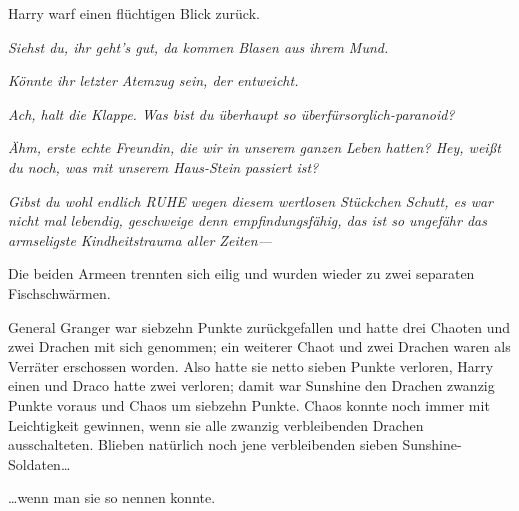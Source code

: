 Harry warf einen flüchtigen Blick zurück.

\emph{Siehst du, ihr geht’s gut, da kommen Blasen aus ihrem Mund.}

\emph{Könnte ihr letzter Atemzug sein, der entweicht.}

\emph{Ach, halt die Klappe. Was bist du überhaupt so überfürsorglich-paranoid?}

\emph{Ähm, erste echte Freundin, die wir in unserem ganzen Leben hatten? Hey, weißt du noch, was mit unserem Haus-Stein passiert ist?}

\emph{Gibst du wohl endlich RUHE wegen diesem wertlosen Stückchen Schutt, es war nicht mal lebendig, geschweige denn empfindungsfähig, das ist so ungefähr das armseligste Kindheitstrauma aller Zeiten—}

Die beiden Armeen trennten sich eilig und wurden wieder zu zwei separaten Fischschwärmen.

General Granger war siebzehn Punkte zurückgefallen und hatte drei Chaoten und zwei Drachen mit sich genommen; ein weiterer Chaot und zwei Drachen waren als Verräter erschossen worden. Also hatte sie netto sieben Punkte verloren, Harry einen und Draco hatte zwei verloren; damit war Sunshine den Drachen zwanzig Punkte voraus und Chaos um siebzehn Punkte. Chaos konnte noch immer mit Leichtigkeit gewinnen, wenn sie alle zwanzig verbleibenden Drachen ausschalteten. Blieben natürlich noch jene verbleibenden sieben Sunshine-Soldaten…

…wenn man sie so nennen konnte.

